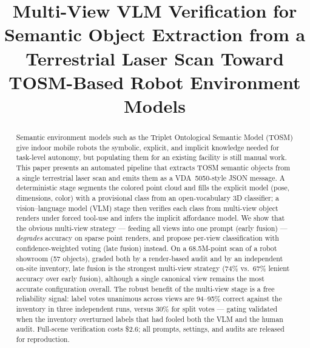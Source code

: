 \documentclass[conference]{IEEEtran}
\begin{document}
\title{Multi-View VLM Verification for Semantic Object Extraction from a
Terrestrial Laser Scan Toward TOSM-Based Robot Environment Models}

\author{
}

\maketitle

\begin{abstract}
Semantic environment models such as the Triplet Ontological Semantic Model
(TOSM) give indoor mobile robots the symbolic, explicit, and implicit
knowledge needed for task-level autonomy, but populating them for an
existing facility is still manual work. This paper presents an automated
pipeline that extracts TOSM semantic objects from a single terrestrial
laser scan and emits them as a VDA~5050-style JSON message. A deterministic
stage segments the colored point cloud and fills the explicit model (pose,
dimensions, color) with a provisional class from an open-vocabulary 3D
classifier; a vision--language model (VLM) stage then verifies each class
from multi-view object renders under forced tool-use and infers the
implicit affordance model. We show that the obvious multi-view strategy ---
feeding all views into one prompt (early fusion) --- \emph{degrades}
accuracy on sparse point renders, and propose per-view classification with
confidence-weighted voting (late fusion) instead. On a 68.5M-point scan of
a robot showroom (57 objects), graded both by a render-based audit and by
an independent on-site inventory, late fusion is the strongest multi-view
strategy (74\% vs.\ 67\% lenient accuracy over early fusion), although a
single canonical view remains the most accurate configuration overall. The
robust benefit of the multi-view stage is a free reliability signal: label
votes unanimous across views are 94--95\% correct against the inventory in
three independent runs, versus 30\% for split votes --- gating validated
when the inventory overturned labels that had fooled both the VLM and the
human audit. Full-scene verification costs \$2.6; all prompts, settings,
and audits are released for reproduction.
\end{abstract}
\end{document}
